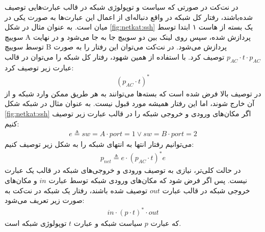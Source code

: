 در نت‌کت در صورتی که سیاست و توپولوژی شبکه در قالب عبارت‌هایی توصیف شده‌باشند،
رفتار کل شبکه در واقع دنباله‌ای از اعمال این عبارت‌ها به صورت یکی در میان است.
به عنوان مثال در شکل
\ref{fig:netkat:ssh}
یک بسته از هاست ۱ ابتدا توسط سوییچ
A
پردازش شده، سپس روی لینک بین دو سوییچ جا به جا می‌شود و در نهایت توسط سوییچ
B
پردازش می‌شود.
در نت‌کت می‌توان این رفتار را به صورت
$p_{AC}\cdot t \cdot p_{AC}$
توصیف کرد.
با استفاده از همین شهود، رفتار کل شبکه را می‌توان در قالب عبارت زیر توصیف کرد:
\begin{align*}
    (p_{AC}\cdot t)^*
\end{align*}
در توصیف بالا فرض شده است که بسته‌ها می‌توانند به هر طریق ممکن وارد شبکه و از آن خارج شوند، اما این رفتار همیشه مورد قبول نیست.
به عنوان مثال در شبکه شکل
\ref{fig:netkat:ssh}
اگر مکان‌های ورودی و خروجی شبکه را در قالب عبارت زیر توصیف کنیم:
\begin{align*}
    e \triangleq sw = A\cdot port = 1 \vee sw = B \cdot port = 2
\end{align*}
می‌توانیم رفتار انتها به انتهای
شبکه را به شکل زیر توصیف کنیم:
\begin{align*}
    p_{net} \triangleq e \cdot (p_{AC}\cdot t)^* e
\end{align*}
در حالت کلی‌تر، نیازی به توصیف ورودی و خروجی‌های شبکه در قالب یک عبارت نیست.
پس اگر فرض شود که مکان‌های ورودی شبکه توسط عبارت
$in$
و مکان‌های خروجی شبکه در قالب عبارت
$out$
توصیف شده‌ باشند، رفتار یک شبکه در نت‌کت به صورت زیر تعریف می‌شود:
\begin{align*}
    in \cdot (p\cdot t)^*\cdot out
\end{align*}
که عبارت
$p$
سیاست شبکه و عبارت
$t$
توپولوژی شبکه است.

